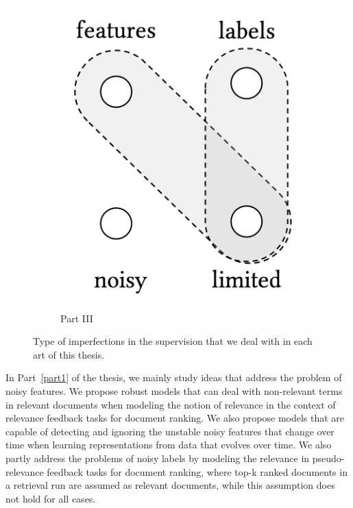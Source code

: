 \begin{figure}[t]
\begin{subfigure}[b]{0.32\textwidth}
    \centering
        \includegraphics[width=0.55\linewidth]{01-introduction/figs_and_tables/fig_p3.png}
        \caption{\label{fig:p1}Part III}
    \end{subfigure}
\caption{\label{fig:thesis_parts}Type of imperfections in the supervision that we deal with in each art of this thesis.}
\end{figure}

In Part~\ref{part1} of the thesis, we mainly study ideas that address the problem of noisy features. We propose robust models that can deal with non-relevant terms in relevant documents when modeling the notion of relevance in the context of relevance feedback tasks for document ranking. We also propose models that are capable of detecting and ignoring the unstable noisy features that change over time when learning representations from data that evolves over time. We also partly address the problems of noisy labels by modeling the relevance in pseudo-relevance feedback tasks for document ranking, where top-k ranked documents in a retrieval run are assumed as relevant documents, while this assumption does not hold for all cases.

